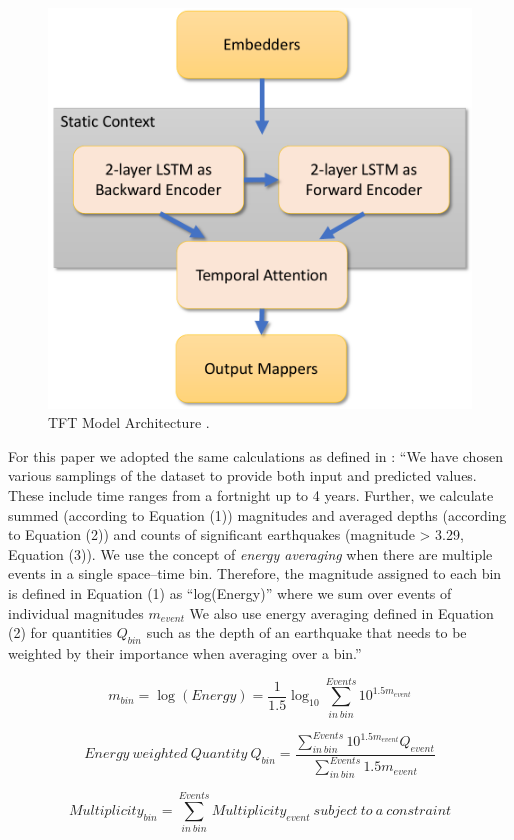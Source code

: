 \documentclass[utf8]{FrontiersinVancouver} %
\begin{document}
\begin{figure}[htb]
    \centering\includegraphics[width=0.5\columnwidth]{images/tft}
    \caption{TFT Model Architecture \citep{fox2022-jm}.}
    \label{fig:TFT_Model_Arch}
\end{figure}


For this paper we adopted the same calculations as defined in \cite{fox2022-jm}: ``We have chosen various samplings of the dataset to provide both input and predicted values. These include time ranges from a fortnight up to 4 years. Further, we calculate summed (according to Equation (1)) magnitudes and averaged depths (according to Equation (2)) and counts of significant earthquakes (magnitude > 3.29, Equation (3)).  We use the concept of {\em energy averaging} when there are multiple events in a single space–time bin. Therefore, the magnitude assigned to each bin is defined in Equation (1) as “log(Energy)” where we sum over events of individual magnitudes $m_{event}$ We also use energy averaging defined in Equation (2) for quantities $Q_{bin}$ such as the depth of an earthquake that needs to be weighted by their importance when averaging over a bin.''

\begin{equation}
m_{bin} = \log(Energy) = \frac{1}{1.5}\log_{10}\sum_{in~bin}^{Events}10^{1.5m_{event}}
\end{equation}

\begin{equation}
Energy~weighted~Quantity~Q_{bin} = \frac{\displaystyle
   \sum^{Events}_{in~bin} 10^{1.5m_{event}} Q_{event}}{\displaystyle \sum^{Events}_{in~bin}1.5m_{event}}
\end{equation}

\begin{equation}
Multiplicity_{bin} = \sum^{Events}_{in~bin}Multiplicity_{event} ~ subject~to~a~constraint
\end{equation}
\end{document}
